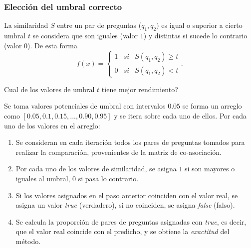 \begin{frame}[allowframebreaks]
	\frametitle{Elección del umbral correcto}
	La similaridad \(S\) entre un par de preguntas (\(q_1,q_2)\) es igual o superior a cierto umbral \(t\) se considera que son iguales (valor \(1\)) y distintas si sucede lo contrario (valor \(0\)). De esta forma
	\[f(x) = \left\{ \begin{array}{lcc} 1 & si & S(q_1, q_2)\geq t
		\\ 0 & si & S(q_1, q_2) < t
	\end{array} \right..\]

	\centering %
	Cual de los valores de umbral \(t\) tiene mejor rendimiento?

	\framebreak

	Se toma valores potenciales de umbral con intervalos \(0.05\) se forma un arreglo como \([0.05, 0.1, 0.15, ..., 0.90, 0.95]\) y se itera sobre cada uno de ellos. Por cada uno de los valores en el arreglo:
	\begin{enumerate}
		\item Se consideran en cada iteración todos los pares de preguntas tomados para realizar la comparación, provenientes de la matriz de co-asociación.
		\item Por cada uno de los valores de similaridad, se asigna \(1\) si son mayores o iguales al umbral, \(0\) si pasa lo contrario.
		\item Si los valores asignados en el paso anterior coinciden con el valor real, se asigna un valor \textit{true} (verdadero), si no coinciden, se asigna \textit{false} (falso).
		\item Se calcula la proporción de pares de preguntas asignadas con \textit{true}, es decir, que el valor real coincide con el predicho, y se obtiene la \textit{exactitud} del método.
	\end{enumerate}

	\framebreak


\end{frame}
